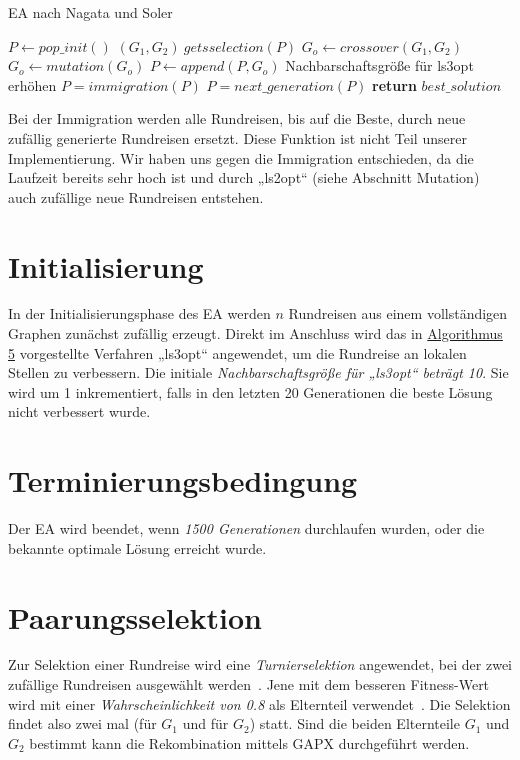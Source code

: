 \begin{algorithm}[H]
\caption{EA nach Nagata und Soler }\label{alg:ea}
\begin{algorithmic}[1]
    \State $P \gets pop\_init()$
      \State $(G_1, G_2) \ gets selection(P)$
      \State $G_o \gets crossover(G_1, G_2)$
        \State $G_o \gets mutation(G_o)$
      \EndIf
      \State $P \gets append(P, G_o)$
        \State Nachbarschaftsgröße für ls3opt erhöhen
        \State $P = immigration(P)$
      \EndIf
      \State $P = next\_generation(P)$
    \EndWhile
    \State \textbf{return} $best\_solution$
  \EndProcedure
\end{algorithmic}
\end{algorithm}
\begin{bem}
  Bei der Immigration werden alle Rundreisen, bis auf die Beste, durch
  neue zufällig generierte Rundreisen ersetzt. Diese Funktion ist nicht
  Teil unserer Implementierung. Wir haben uns gegen die Immigration
  entschieden, da die Laufzeit bereits sehr hoch ist und durch „ls2opt“
  (siehe Abschnitt Mutation) auch zufällige neue Rundreisen entstehen.
\end{bem}
\section{Initialisierung}
In der Initialisierungsphase des EA werden $n$ Rundreisen aus einem
vollständigen Graphen zunächst zufällig erzeugt. Direkt im Anschluss
wird das in \hyperref[alg:ls3opt_run]{Algorithmus 5} vorgestellte Verfahren 
„ls3opt“ angewendet, um die
Rundreise an lokalen Stellen zu verbessern. Die initiale
\textit{Nachbarschaftsgröße für „ls3opt“ beträgt 10}. Sie wird um 1
inkrementiert, falls in den letzten 20 Generationen die beste Lösung
nicht verbessert wurde.
\section{Terminierungsbedingung}
Der EA wird beendet, wenn \textit{1500 Generationen} durchlaufen wurden, oder
die bekannte optimale Lösung erreicht wurde. 
\section{Paarungsselektion}
Zur Selektion einer Rundreise wird eine \textit{Turnierselektion} angewendet, 
bei der zwei zufällige Rundreisen ausgewählt werden~\cite{weicker}. Jene mit dem
besseren Fitness-Wert wird mit einer \textit{Wahrscheinlichkeit von 0.8} als 
Elternteil verwendet~\cite{gapx}. Die Selektion findet also zwei mal 
(für $G_1$ und für $G_2$) statt. Sind die beiden Elternteile $G_1$ und
$G_2$ bestimmt kann die Rekombination mittels GAPX durchgeführt werden.
